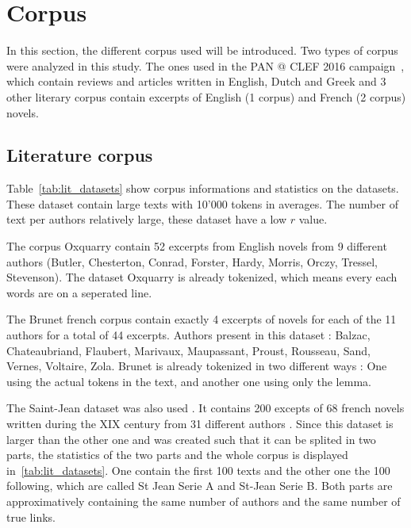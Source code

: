 \section{Corpus}

In this section, the different corpus used will be introduced.
Two types of corpus were analyzed in this study.
The ones used in the PAN @ CLEF 2016 campaign~\cite{pan16}, which contain reviews and articles written in English, Dutch and Greek and 3 other literary corpus contain excerpts of English (1 corpus) and French (2 corpus) novels.

\subsection{Literature corpus}
\label{sec:lit_corpus}

Table~\ref{tab:lit_datasets} show corpus informations and statistics on the datasets.
These dataset contain large texts with 10'000 tokens in averages.
The number of text per authors relatively large, these dataset have a low $r$ value.

The corpus Oxquarry contain 52 excerpts from English novels from 9 different authors (Butler, Chesterton, Conrad, Forster, Hardy, Morris, Orczy, Tressel, Stevenson).
The dataset Oxquarry is already tokenized, which means every each words are on a seperated line.

The Brunet french corpus contain exactly 4 excerpts of novels for each of the 11 authors for a total of 44 excerpts.
Authors present in this dataset : Balzac, Chateaubriand, Flaubert, Marivaux, Maupassant, Proust, Rousseau, Sand, Vernes, Voltaire, Zola.
Brunet is already tokenized in two different ways : One using the actual tokens in the text, and another one using only the lemma.

The Saint-Jean dataset was also used \cite{unine_corpus}.
It contains 200 excepts of 68 french novels written during the XIX century from 31 different authors \cite{st_jean}.
Since this dataset is larger than the other one and was created such that it can be splited in two parts, the statistics of the two parts and the whole corpus is displayed in~\ref{tab:lit_datasets}.
One contain the first 100 texts and the other one the 100 following, which are called St Jean Serie A and St-Jean Serie B.
Both parts are approximatively containing the same number of authors and the same number of true links.


